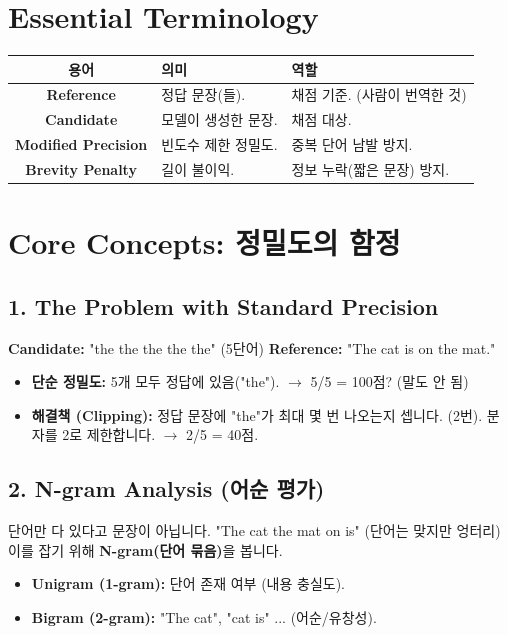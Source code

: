 \documentclass[11pt,a4paper]{book}
\theoremstyle{definition}
\begin{document}
\section{Essential Terminology}
\begin{center}
\begin{tabular}{|c|l|l|}
\hline
\textbf{용어} & \textbf{의미} & \textbf{역할} \\ \hline
\textbf{Reference} & 정답 문장(들). & 채점 기준. (사람이 번역한 것) \\ \hline
\textbf{Candidate} & 모델이 생성한 문장. & 채점 대상. \\ \hline
\textbf{Modified Precision} & 빈도수 제한 정밀도. & 중복 단어 남발 방지. \\ \hline
\textbf{Brevity Penalty} & 길이 불이익. & 정보 누락(짧은 문장) 방지. \\ \hline
\end{tabular}
\end{center}

\section{Core Concepts: 정밀도의 함정}

\subsection{1. The Problem with Standard Precision}


\textbf{Candidate:} "the the the the the" (5단어)
\textbf{Reference:} "The cat is on the mat."
\begin{itemize}
    \item \textbf{단순 정밀도:} 5개 모두 정답에 있음("the"). $\rightarrow$ 5/5 = 100점? (말도 안 됨)
    \item \textbf{해결책 (Clipping):} 정답 문장에 "the"가 최대 몇 번 나오는지 셉니다. (2번). 분자를 2로 제한합니다. $\rightarrow$ 2/5 = 40점.
\end{itemize}

\subsection{2. N-gram Analysis (어순 평가)}
단어만 다 있다고 문장이 아닙니다.
"The cat the mat on is" (단어는 맞지만 엉터리)
이를 잡기 위해 \textbf{N-gram(단어 묶음)}을 봅니다.
\begin{itemize}
    \item \textbf{Unigram (1-gram):} 단어 존재 여부 (내용 충실도).
    \item \textbf{Bigram (2-gram):} "The cat", "cat is" ... (어순/유창성).
\end{itemize}
\end{document}
